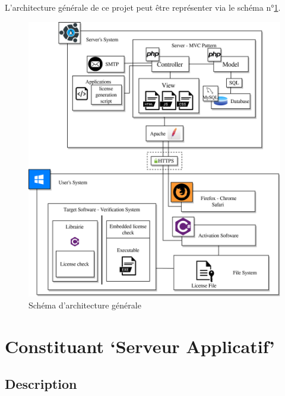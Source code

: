 L'architecture générale de ce projet peut être représenter via 
le schéma n°\ref{fig:fig1}.\newline

\newpage

\begin{figure}[h!]
	\centering
    \includegraphics[width=\textwidth]{../png/DAT_general.png}
	\caption{Schéma d'architecture générale}
	\label{fig:fig1}
\end{figure}

\newpage

\section{Constituant `Serveur Applicatif'}

\subsection{Description}

